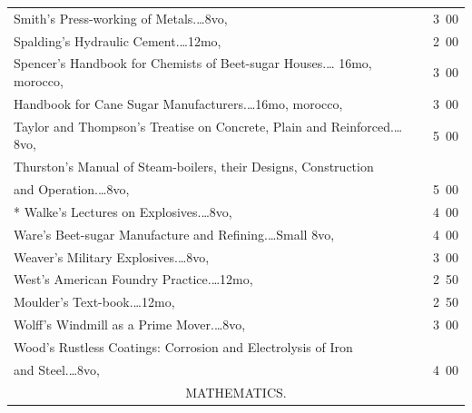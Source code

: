 \documentclass[a4paper,12pt]{book}[2004/02/16]
\theoremstyle{ilemma}
\theoremstyle{itheorem}
\theoremstyle{iother}
\theoremstyle{icorollary}
\theoremstyle{numcorollary}
\theoremstyle{idefinition}
\begin{document}
\begin{longtable}{@{}l@{ }r@{}}
Smith's Press-working of Metals.\dotfill\ldots 8vo, &3\ 00\\

Spalding's Hydraulic Cement.\dotfill\ldots 12mo, &2\ 00\\

Spencer's Handbook for Chemists of Beet-sugar Houses.\dotfill\ldots
16mo, morocco, &3\ 00\\

\nopagebreak

\indent Handbook for Cane Sugar Manufacturers.\dotfill\ldots 16mo,
morocco, &3\ 00\\

Taylor and Thompson's Treatise on Concrete, Plain and
Reinforced.\dotfill\ldots 8vo, &5\ 00\\

Thurston's Manual of Steam-boilers, their Designs, Construction\\

\nopagebreak

\indent\indent and Operation.\dotfill\ldots 8vo, &5\ 00\\

* Walke's Lectures on Explosives.\dotfill\ldots 8vo, &4\ 00\\

Ware's Beet-sugar Manufacture and Refining.\dotfill\ldots Small 8vo,
&4\ 00\\

Weaver's Military Explosives.\dotfill\ldots 8vo, &3\ 00\\

West's American Foundry Practice.\dotfill\ldots 12mo, &2\ 50\\

\nopagebreak

\indent Moulder's Text-book.\dotfill\ldots 12mo, &2\ 50\\

Wolff's Windmill as a Prime Mover.\dotfill\ldots 8vo, &3\ 00\\

Wood's Rustless Coatings: Corrosion and Electrolysis of Iron\\

\nopagebreak

\indent\indent and Steel.\dotfill\ldots 8vo, &4\ 00\\[3em]



\multicolumn{2}{c}{\large MATHEMATICS.}\\[1em]


\end{longtable}
\end{document}
